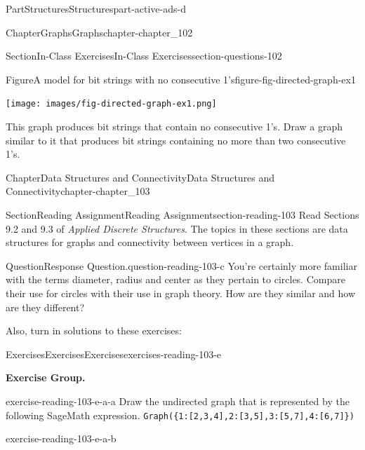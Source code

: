 \documentclass[oneside,10pt,]{book}
\newcommand{\mono}[1]{\texttt{#1}}
\numberwithin{equation}{section}
\begin{document}
\begin{partptx}{Part}{Structures}{}{Structures}{}{}{part-active-ads-d}
\begin{chapterptx}{Chapter}{Graphs}{}{Graphs}{}{}{chapter-chapter_102}
\begin{sectionptx}{Section}{In-Class Exercises}{}{In-Class Exercises}{}{}{section-questions-102}
\begin{enumerate}[label=\arabic*.]
\begin{figureptx}{Figure}{A model for bit strings with no consecutive 1's}{figure-fig-directed-graph-ex1}{}
\begin{image}{0.15}{0.7}{0.15}{}
\texttt{[image: images/fig-directed-graph-ex1.png]}
\end{image}%
\tcblower
\end{figureptx}%
This graph produces bit strings that contain no consecutive 1's.   Draw a graph similar to it that produces bit strings containing no more than two consecutive 1's.%
\end{enumerate}
%
\end{sectionptx}
\end{chapterptx}
%
\typeout{************************************************}
\typeout{************************************************}
%
\begin{chapterptx}{Chapter}{Data Structures and Connectivity}{}{Data Structures and Connectivity}{}{}{chapter-chapter_103}
\renewcommand*{\chaptername}{Chapter}
\index{}%
%
%
\typeout{************************************************}
\typeout{************************************************}
%
\begin{sectionptx}{Section}{Reading Assignment}{}{Reading Assignment}{}{}{section-reading-103}
Read Sections 9.2 and 9.3 of \emph{Applied Discrete Structures}. The topics in these sections are data structures for graphs and connectivity between vertices in a graph.%
\begin{question}{Question}{Response Question.}{question-reading-103-c}%
You're certainly more familiar with the terms diameter, radius and center as they pertain to circles.  Compare their use for circles with their use in graph theory.   How are they similar and how are they different?%
\end{question}
Also, turn in solutions to these exercises:%
%
%
\typeout{************************************************}
\typeout{************************************************}
%
\begin{exercises-subsection-numberless}{Exercises}{Exercises}{}{Exercises}{}{}{exercises-reading-103-e}
\par\medskip\noindent%
\textbf{Exercise Group.}\space\space%
\begin{exercisegroup}
\begin{divisionexerciseeg}{1}{}{}{exercise-reading-103-e-a-a}%
Draw the undirected graph that is represented by the following SageMath expression. \mono{Graph(\{1:[2,3,4],2:[3,5],3:[5,7],4:[6,7]\})}%
\end{divisionexerciseeg}%
\begin{divisionexerciseeg}{2}{}{}{exercise-reading-103-e-a-b}%

\end{divisionexerciseeg}
\end{exercisegroup}
\end{exercises-subsection-numberless}
\end{sectionptx}
\end{chapterptx}
\end{partptx}
\end{document}
